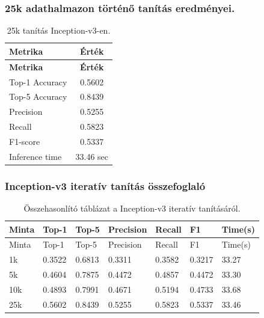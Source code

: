     \subsubsection{25k adathalmazon történő tanítás eredményei.}
      \begin{center}
        \begin{longtable}{l c}
        \caption{25k tanítás Inception-v3-en.} \label{tab:phase03_Inception-v3_25k} \\
        \toprule
        \textbf{Metrika} & \textbf{Érték} \\
        \midrule
        \endfirsthead
        \toprule
        \textbf{Metrika} & \textbf{Érték} \\
        \midrule
        \endhead
        Top-1 Accuracy & 0.5602 \\
        Top-5 Accuracy & 0.8439 \\
        Precision      & 0.5255 \\
        Recall         & 0.5823 \\
        F1-score       & 0.5337 \\
        Inference time & 33.46 sec \\
        \bottomrule
        \end{longtable}
      \end{center}
    
    \subsubsection{Inception-v3 iteratív tanítás összefoglaló}
      \begin{center}
        \begin{longtable}{lllllll}
        \caption{Összehasonlító táblázat a Inception-v3 iteratív tanításáról.}\label{tab:phase3_Inception-v3_summary_table}\\
        \toprule
        Minta & Top-1 & Top-5 & Precision & Recall & F1 & Time(s) \\
        \midrule
        \endfirsthead
        \toprule
        Minta & Top-1 & Top-5 & Precision & Recall & F1 & Time(s) \\
        \midrule
        \endhead
        1k & 0.3522 & 0.6813 & 0.3311 & 0.3582 & 0.3217 & 33.27 \\
        5k & 0.4604 & 0.7875 & 0.4472 & 0.4857 & 0.4472 & 33.30 \\
        10k & 0.4893 & 0.7991 & 0.4671 & 0.5194 & 0.4733 & 33.68 \\
        25k & 0.5602 & 0.8439 & 0.5255 & 0.5823 & 0.5337 & 33.46 \\
        \bottomrule
        \end{longtable}
      \end{center}
    
